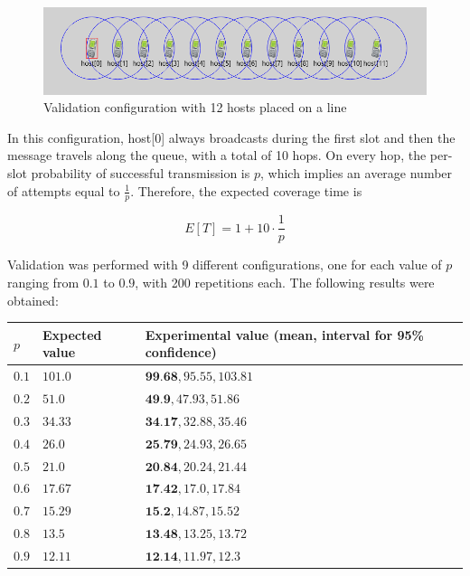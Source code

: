 \begin{figure}[H]
    \begin{center}
        \includegraphics[scale=0.75]{img/singleQueueGUI.png}
        \caption{Validation configuration with 12 hosts placed on a line}
        \label{fig:single_queueGUI}
    \end{center}
    \vspace*{-0.8cm}
\end{figure}

In this configuration, host[0] always broadcasts during the first slot and then the message travels along the queue, with a total of 10 hops. On every hop, the per-slot probability of successful transmission is $p$, which implies an average number of attempts equal to $\frac{1}{p}$. Therefore, the expected coverage time is

\begin{equation}
    E[T] = 1 + 10 \cdot \frac{1}{p}
    \label{eq:singleQueueValidationAvgT}
\end{equation}

Validation was performed with 9 different configurations, one for  each value of $p$ ranging from $0.1$ to $0.9$, with 200 repetitions each.
The following results were obtained:

\begin{center}
\begin{tabular}{ | m{1cm} | m{5cm}| m{5cm} | }
\hline
$p$& Expected value & Experimental value (mean, interval for 95\% confidence)\\
\hline
$0.1$&$101.0$&$\textbf{99.68}, 95.55, 103.81$\\
\hline
$0.2$&$51.0$&$\textbf{49.9}, 47.93, 51.86$\\
\hline
$0.3$&$34.33$&$\textbf{34.17}, 32.88, 35.46$\\
\hline
$0.4$&$26.0$&$\textbf{25.79}, 24.93, 26.65$\\
\hline
$0.5$&$21.0$&$\textbf{20.84}, 20.24, 21.44$\\
\hline
$0.6$&$17.67$&$\textbf{17.42}, 17.0, 17.84$\\
\hline
$0.7$&$15.29$&$\textbf{15.2}, 14.87, 15.52$\\
\hline
$0.8$&$13.5$&$\textbf{13.48}, 13.25, 13.72$\\
\hline
$0.9$&$12.11$&$\textbf{12.14}, 11.97, 12.3$\\
\hline
\end{tabular}
\end{center}

